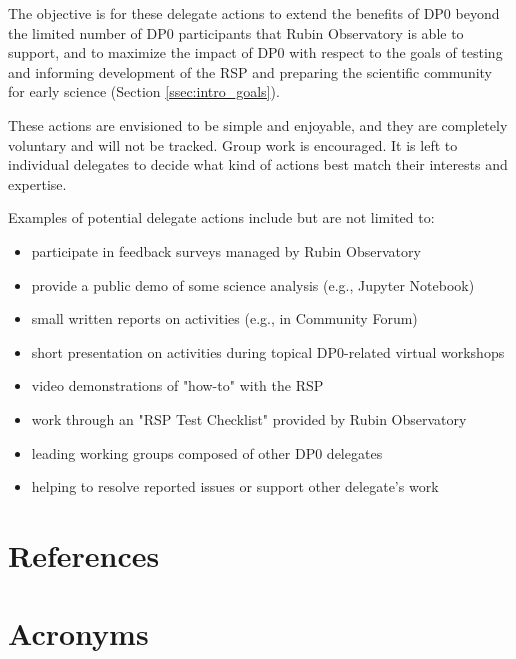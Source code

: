 \documentclass[DM,lsstdraft,authoryear,toc]{lsstdoc}
\begin{document}
The objective is for these delegate actions to extend the benefits of DP0 beyond the limited number of DP0 participants that Rubin Observatory is able to support, and to maximize the impact of DP0 with respect to the goals of testing and informing development of the RSP and preparing the scientific community for early science (Section \ref{ssec:intro_goals}). 

These actions are envisioned to be simple and enjoyable, and they are completely voluntary and will not be tracked.
Group work is encouraged.
It is left to individual delegates to decide what kind of actions best match their interests and expertise. 

Examples of potential delegate actions include but are not limited to:
\begin{itemize}
\item participate in feedback surveys managed by Rubin Observatory
\item provide a public demo of some science analysis (e.g., Jupyter Notebook)
\item small written reports on activities (e.g., in Community Forum)
\item short presentation on activities during topical DP0-related virtual workshops
\item video demonstrations of "how-to" with the RSP
\item work through an "RSP Test Checklist" provided by Rubin Observatory
\item leading working groups composed of other DP0 delegates
\item helping to resolve reported issues or support other delegate's work
\end{itemize}


\appendix
\section{References} \label{sec:bib}
\renewcommand{\refname}{} %


\section{Acronyms}



% 
\end{document}
